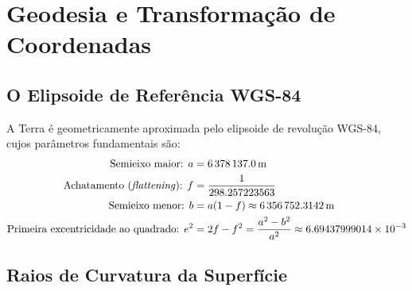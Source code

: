 \documentclass[11pt,a4paper]{article}
\theoremstyle{definition}
\begin{document}
\section{Geodesia e Transformação de Coordenadas}

\subsection{O Elipsoide de Referência WGS-84}
A Terra é geometricamente aproximada pelo elipsoide de revolução WGS-84, cujos parâmetros fundamentais são:
\begin{align}
    \text{Semieixo maior: } a &= 6\,378\,137.0\,\text{m} \\
    \text{Achatamento (\textit{flattening}): } f &= \frac{1}{298.257223563} \\
    \text{Semieixo menor: } b &= a(1 - f) \approx 6\,356\,752.3142\,\text{m} \\
    \text{Primeira excentricidade ao quadrado: } e^2 &= 2f - f^2 = \frac{a^2 - b^2}{a^2} \approx 6.69437999014 \times 10^{-3}
\end{align}

\subsection{Raios de Curvatura da Superfície}
\end{document}
